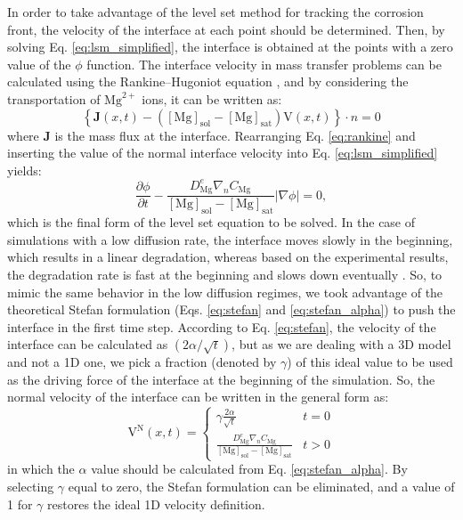 In order to take advantage of the level set method for tracking the corrosion front, the velocity of the interface at each point should be determined. Then, by solving Eq. \ref{eq:lsm_simplified}, the interface is obtained at the points with a zero value of the $\phi$ function. The interface velocity in mass transfer problems can be calculated using the Rankine–Hugoniot equation \cite{Scheiner2007}, and by considering the transportation of $\mathrm{Mg}^{2+}$ ions, it can be written as:
\begin{equation} \label{eq:rankine}
\left\{\mathbf{J}(x, t)-\left([\mathrm{Mg}]_{\mathrm{sol}}-[\mathrm{Mg}]_{\mathrm{sat}}\right) \mathrm{V}(x, t)\right\} \cdot n=0
\end{equation}
where $\mathbf{J}$ is the mass flux at the interface. Rearranging Eq. \ref{eq:rankine} and inserting the value of the normal interface velocity into Eq. \ref{eq:lsm_simplified} yields:
\begin{equation} \label{eq:lsm_final}
\frac{\partial \phi}{\partial t}-\frac{D_{\mathrm{Mg}}^{e} \nabla_{n} C_\mathrm{Mg}}{[\mathrm{Mg}]_{\mathrm{sol}}-[\mathrm{Mg}]_{\mathrm{sat}}}|\nabla \phi|=0,
\end{equation}
which is the final form of the level set equation to be solved. In the case of simulations with a low diffusion rate, the interface moves slowly in the beginning, which results in a linear degradation, whereas based on the experimental results, the degradation rate is fast at the beginning and slows down eventually \cite{Mei2019}. So, to mimic the same behavior in the low diffusion regimes, we took advantage of the theoretical Stefan formulation (Eqs. \ref{eq:stefan} and \ref{eq:stefan_alpha}) to push the interface in the first time step. According to Eq. \ref{eq:stefan}, the velocity of the interface can be calculated as $({2\alpha}/{\sqrt{t}})$, but as we are dealing with a 3D model and not a 1D one, we pick a fraction (denoted by $\gamma$) of this ideal value to be used as the driving force of the interface at the beginning of the simulation. So, the normal velocity of the interface can be written in the general form as:
\begin{equation} \label{eq:normal_vel}
\mathrm{V}^\mathrm{N}(x, t)=\left\{\begin{array}{ll}
\gamma\frac{2\alpha}{\sqrt{t}} & t=0 \\
\frac{D_{\mathrm{Mg}}^{e} \nabla_{n} C_\mathrm{Mg}}{[\mathrm{Mg}]_{\mathrm{sol}}-[\mathrm{Mg}]_{\mathrm{sat}}} & t > 0
\end{array}\right.
\end{equation}
in which the $\alpha$ value should be calculated from Eq. \ref{eq:stefan_alpha}. By selecting $\gamma$ equal to zero, the Stefan formulation can be eliminated, and a value of 1 for $\gamma$ restores the ideal 1D velocity definition.

